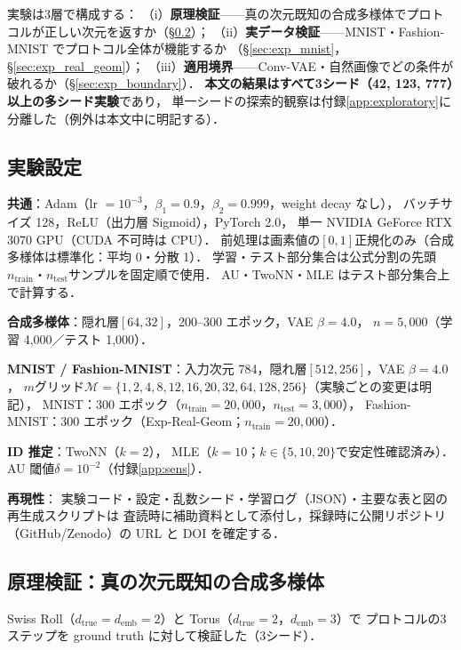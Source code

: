 \documentclass[11pt,a4paper]{jsarticle}
\newcommand{\dtrue}{d_{\mathrm{true}}}
\newcommand{\demb}{d_{\mathrm{emb}}}
\begin{document}
実験は3層で構成する：
（i）\textbf{原理検証}——真の次元既知の合成多様体でプロトコルが正しい次元を返すか（§\ref{sec:exp_syn}）；
（ii）\textbf{実データ検証}——MNIST・Fashion-MNIST でプロトコル全体が機能するか
（§\ref{sec:exp_mnist}，§\ref{sec:exp_real_geom}）；
（iii）\textbf{適用境界}——Conv-VAE・自然画像でどの条件が破れるか（§\ref{sec:exp_boundary}）．
\textbf{本文の結果はすべて3シード（42, 123, 777）以上の多シード実験}であり，
単一シードの探索的観察は付録\ref{app:exploratory}に分離した（例外は本文中に明記する）．

\subsection{実験設定}\label{sec:exp_setup}

\textbf{共通}：Adam（lr $= 10^{-3}$，$\beta_1 = 0.9$，$\beta_2 = 0.999$，weight decay なし），
バッチサイズ 128，ReLU（出力層 Sigmoid），PyTorch 2.0，
単一 NVIDIA GeForce RTX 3070 GPU（CUDA 不可時は CPU）．
前処理は画素値の$[0,1]$正規化のみ（合成多様体は標準化：平均 0・分散 1）．
学習・テスト部分集合は公式分割の先頭$n_{\mathrm{train}}$・$n_{\mathrm{test}}$サンプルを固定順で使用．
AU・TwoNN・MLE はテスト部分集合上で計算する．

\textbf{合成多様体}：隠れ層$[64, 32]$，200--300 エポック，VAE $\beta = 4.0$，
$n = 5{,}000$（学習 4,000／テスト 1,000）．

\textbf{MNIST / Fashion-MNIST}：入力次元 784，隠れ層$[512, 256]$，VAE $\beta = 4.0$，
$m$グリッド$\mathcal{M} = \{1, 2, 4, 8, 12, 16, 20, 32, 64, 128, 256\}$（実験ごとの変更は明記），
MNIST：300 エポック（$n_{\mathrm{train}} = 20{,}000$，$n_{\mathrm{test}} = 3{,}000$），
Fashion-MNIST：300 エポック（Exp-Real-Geom；$n_{\mathrm{train}} = 20{,}000$）．

\textbf{ID 推定}：TwoNN（$k = 2$）\cite{facco2017twonn}，
MLE（$k = 10$；$k \in \{5, 10, 20\}$で安定性確認済み）\cite{levina2005mle}．
AU 閾値$\delta = 10^{-2}$（付録\ref{app:sens}）．

\textbf{再現性}：
実験コード・設定・乱数シード・学習ログ（JSON）・主要な表と図の再生成スクリプトは
査読時に補助資料として添付し，採録時に公開リポジトリ（GitHub/Zenodo）の URL と DOI を確定する．

\subsection{原理検証：真の次元既知の合成多様体}\label{sec:exp_syn}

Swiss Roll（$\dtrue = \demb = 2$）と Torus（$\dtrue = 2$，$\demb = 3$）で
プロトコルの3ステップを ground truth に対して検証した（3シード）．
\end{document}
